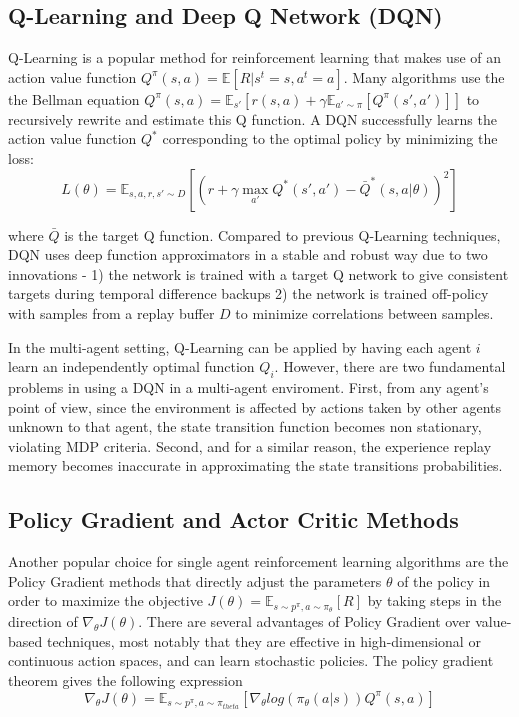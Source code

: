 \subsection{Q-Learning and Deep Q Network (DQN)}

Q-Learning is a popular method for reinforcement learning that makes use of an action value function $Q^{\pi}(s, a) = \mathbb{E}[R | s^t = s, a^t = a]$. Many algorithms use the the Bellman equation $Q^{\pi}(s, a) = \mathbb{E}_{s'}[r(s, a) + \gamma \mathbb{E}_{a' \sim \pi}[Q^{\pi}(s', a')]]$ to recursively rewrite and estimate this Q function. A DQN successfully learns the action value function $Q^*$ corresponding to the optimal policy by minimizing the loss:
\begin{equation}
	L(\theta) = \mathbb{E}_{s,a,r,s'\sim D} [(r + \gamma \max_{a'} Q^{*}(s', a') - \bar{Q}^{*}(s, a | \theta))^2]
\end{equation}

where $\bar{Q}$ is the target Q function. Compared to previous Q-Learning techniques, DQN uses deep function approximators in a stable and robust way due to two innovations - 1) the network is trained with a target Q network to give consistent targets during temporal difference backups 2) the network is trained off-policy with samples from a replay buffer $D$ to minimize correlations between samples.

In the multi-agent setting, Q-Learning can be applied by having each agent $i$ learn an independently optimal function $Q_i$. However, there are two fundamental problems in using a DQN in a multi-agent enviroment. First, from any agent's point of view, since the environment is affected by actions taken by other agents unknown to that agent, the state transition function becomes non stationary, violating MDP criteria. Second, and for a similar reason, the experience replay memory becomes inaccurate in approximating the state transitions probabilities.

\subsection{Policy Gradient and Actor Critic Methods}

Another popular choice for single agent reinforcement learning algorithms are the Policy Gradient methods that directly adjust the parameters $\theta$ of the policy in order to maximize the objective $J(\theta) = \mathbb{E}_{s \sim p^{\pi}, a \sim \pi_{\theta}}[R]$ by taking steps in the direction of $\nabla_{\theta} J(\theta)$. There are several advantages of Policy Gradient over value-based techniques, most notably that they are effective in high-dimensional or continuous action spaces, and can learn stochastic policies. The policy gradient theorem gives the following expression
\begin{equation}
	\nabla_{\theta} J(\theta) = \mathbb{E}_{s \sim p^{\pi}, a \sim \pi_{theta}} [\nabla_{\theta} log(\pi_{\theta}(a|s))Q^{\pi}(s, a)]
\end{equation}

